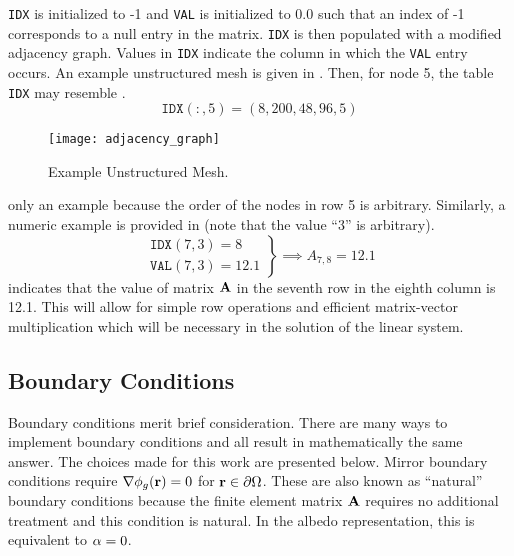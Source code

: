    \texttt{IDX} is initialized to -1 and \texttt{VAL} is initialized 
    to 0.0 such that an index of -1 corresponds to a null entry in the 
    matrix. \texttt{IDX} is then populated with a modified adjacency graph. 
    Values in \texttt{IDX} indicate the column in which the \texttt{VAL} entry
    occurs. An example unstructured mesh is given in . 
    Then, for node 5, the table \texttt{IDX} may resemble .
    \begin{equation}
      \label{eq:idx_example}
      \texttt{IDX}(:,5) = (8, 200, 48, 96, 5 )
    \end{equation}
    \begin{figure}
      \centering
      \texttt{[image: adjacency\_graph]}
      \caption{Example Unstructured Mesh.}
      \label{fig:adjacency_graph}
    \end{figure}
     only an example because the order of the nodes in row
    5 is arbitrary. Similarly, a numeric example is provided in 
     (note that the value ``3'' is arbitrary).
    \begin{equation}
      \label{eq:idx_number}
      \left.
      \begin{array}{c}
        \texttt{IDX}(7,3) = 8 \\
        \texttt{VAL}(7,3) = 12.1
      \end{array}
      \right\}
      \implies
      A_{7,8} = 12.1
    \end{equation}
     indicates that the value of matrix $\mathbf{A}$ in the
    seventh row in the eighth column is 12.1. This will allow for simple row 
    operations and efficient matrix-vector multiplication which will be 
    necessary in the solution of the linear system.

  \subsection{Boundary Conditions}
    \label{sec:boundary_conditions}
    Boundary conditions merit brief consideration. There are many ways to 
    implement boundary conditions and all result in mathematically the same 
    answer. The choices made for this work are presented below. Mirror 
    boundary conditions require $\mathbf{\nabla} \phi_g(\mathbf{r}) = 0$ for 
    $\mathbf{r} \in \partial \Omega$. These are also known as ``natural'' boundary
    conditions because the finite element matrix $\mathbf{A}$ requires no additional 
    treatment and this condition is natural. In the albedo representation, this
    is equivalent to $\alpha = 0$.
    
